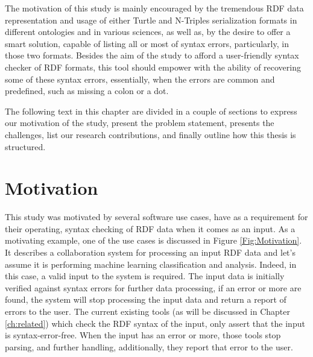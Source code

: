 The motivation of this study is mainly  encouraged by the  tremendous RDF data representation and usage of either Turtle and N-Triples serialization formats in different ontologies and in various sciences, as well as, by the desire to offer a smart solution, capable of listing all or most of syntax errors, particularly, in those two formats. Besides the aim of the study to afford a user-friendly syntax checker of RDF formats, this tool should empower with the ability of recovering some of these syntax errors, essentially, when the errors are common and predefined, such as missing a colon or a dot.  


The following text in this chapter are divided in a couple of sections to express our motivation of the study, present the problem statement, presents the challenges, list our research contributions, and finally outline how this thesis is structured.  

\section{Motivation}

This study was motivated by several software use cases, have as a requirement for their operating, syntax checking of RDF data when it comes as an input. As a motivating example, one of the use cases is discussed in {Figure \ref{Fig:Motivation}}. It describes a collaboration system for processing an input RDF data and let's assume it is performing machine learning classification and analysis. Indeed, in this case, a valid input to the system is required. The input data is initially verified against syntax errors for further data processing, if an error or more are found, the system will stop processing the input data and return a report of errors to the user. The current existing tools (as will be discussed in Chapter \ref{ch:related}) which check the RDF syntax of the input,  only assert that the input is  syntax-error-free. When the input has an error or more, those tools stop  parsing, and further handling, additionally, they report that error to the user. 

